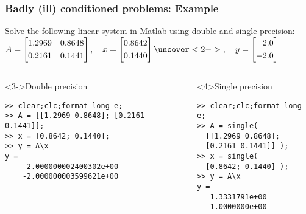 \begin{frame}[fragile]
  \frametitle{Badly (ill) conditioned problems: Example}
  Solve the following linear system in Matlab using double and single precision:\\
  $ A = 
      \left[\begin{aligned}
       1.2969 & & 0.8648 \\%
       0.2161 & & 0.1441
      \end{aligned}\right], \quad 
     x = \left[\begin{aligned}
       0.8642  \\%
       0.1440 
     \end{aligned}\right]
     \uncover<2->{, \quad 
     y = \left[\begin{aligned}
       2.0 \\%
       -2.0 
     \end{aligned}\right]} $
\begin{columns}[T]
  \begin{block}<3->{Double precision}
    \begin{lstlisting}
>> clear;clc;format long e;
>> A = [[1.2969 0.8648]; [0.2161 0.1441]];
>> x = [0.8642; 0.1440];
>> y = A\x
y =
     2.000000002400302e+00
    -2.000000003599621e+00
    \end{lstlisting}
  \end{block}
  \pause 
    \begin{block}<4>{Single precision}
      \begin{lstlisting}
>> clear;clc;format long e;
>> A = single(
  [[1.2969 0.8648];
  [0.2161 0.1441]] );
>> x = single(
  [0.8642; 0.1440] );
>> y = A\x
y =
   1.3331791e+00
  -1.0000000e+00
    \end{lstlisting}
  \end{block}
\end{columns}
\end{frame}



